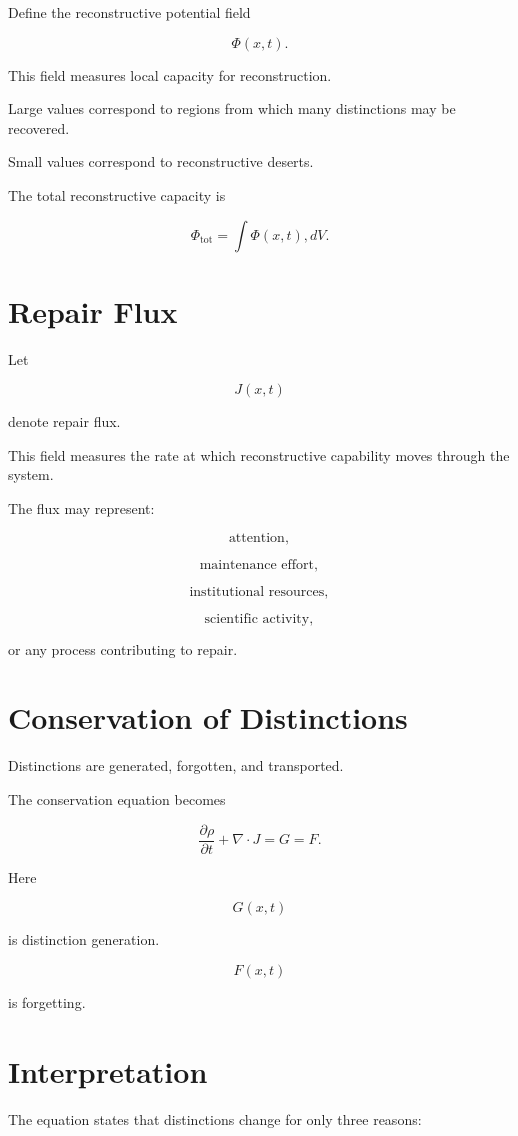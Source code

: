 \documentclass[12pt,oneside]{book}
\theoremstyle{plain} \newtheorem{theorem}{Theorem}[chapter] \newtheorem{lemma}[theorem]{Lemma} \newtheorem{proposition}[theorem]{Proposition} \newtheorem{corollary}[theorem]{Corollary}
\theoremstyle{definition} \newtheorem{definition}[theorem]{Definition} \newtheorem{axiom}[theorem]{Axiom} \newtheorem{construction}[theorem]{Construction}
\theoremstyle{remark} \newtheorem{remark}[theorem]{Remark} \newtheorem{example}[theorem]{Example}
\begin{document}
Define the reconstructive potential field

\[
\Phi(x,t).
\]

This field measures local capacity for reconstruction.

Large values correspond to regions from which many distinctions may be recovered.

Small values correspond to reconstructive deserts.

The total reconstructive capacity is

\[
\Phi_{\mathrm{tot}}
=
\int
\Phi(x,t),dV.
\]

\section{Repair Flux}

Let

\[
J(x,t)
\]

denote repair flux.

This field measures the rate at which reconstructive capability moves through the system.

The flux may represent:

\[
\text{attention},
\]

\[
\text{maintenance effort},
\]

\[
\text{institutional resources},
\]

\[
\text{scientific activity},
\]

or any process contributing to repair.

\section{Conservation of Distinctions}

Distinctions are generated, forgotten, and transported.

The conservation equation becomes

\[
\frac{\partial \rho}{\partial t}
+
\nabla\cdot J
=
G
=
F.
\]

Here

\[
G(x,t)
\]

is distinction generation.

\[
F(x,t)
\]

is forgetting.

\section{Interpretation}

The equation states that distinctions change for only three reasons:
\end{document}
